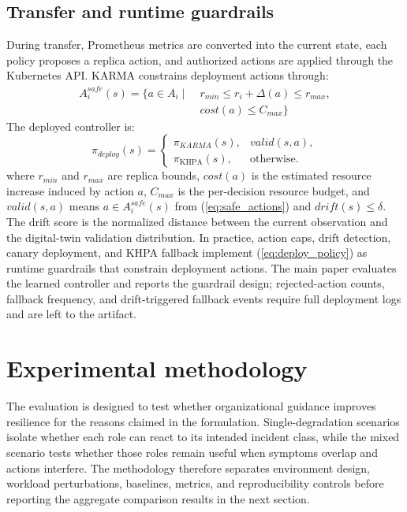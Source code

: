 \documentclass[journal]{IEEEtran}
\newcommand{\khpa}{\mathrm{KHPA}}
\begin{document}
\subsection{Transfer and runtime guardrails}

During transfer, Prometheus metrics are converted into the current state, each policy proposes a replica action, and authorized actions are applied through the Kubernetes API. KARMA constrains deployment actions through:
\begin{equation}
  \begin{aligned}
    A_i^{safe}(s)=\{a\in A_i \mid\; & r_{min}\le r_i+\Delta(a)\le r_{max}, \\
                                    & cost(a)\le C_{max}\}
  \end{aligned}
  \label{eq:safe_actions}
\end{equation}
The deployed controller is:
\begin{equation}
  \pi_{deploy}(s)=
  \begin{cases}
    \pi_{KARMA}(s), & valid(s,a),       \\
    \pi_{\khpa}(s), & \text{otherwise}.
  \end{cases}
  \label{eq:deploy_policy}
\end{equation}
where $r_{min}$ and $r_{max}$ are replica bounds, $cost(a)$ is the estimated resource increase induced by action $a$, $C_{max}$ is the per-decision resource budget, and $valid(s,a)$ means $a\in A_i^{safe}(s)$ from (\autoref{eq:safe_actions}) and $drift(s)\le\delta$. The drift score is the normalized distance between the current observation and the digital-twin validation distribution. In practice, action caps, drift detection, canary deployment, and KHPA fallback implement (\autoref{eq:deploy_policy}) as runtime guardrails that constrain deployment actions. The main paper evaluates the learned controller and reports the guardrail design; rejected-action counts, fallback frequency, and drift-triggered fallback events require full deployment logs and are left to the artifact.

\section{Experimental methodology}
\label{sec:methodology}

The evaluation is designed to test whether organizational guidance improves resilience for the reasons claimed in the formulation. Single-degradation scenarios isolate whether each role can react to its intended incident class, while the mixed scenario tests whether those roles remain useful when symptoms overlap and actions interfere. The methodology therefore separates environment design, workload perturbations, baselines, metrics, and reproducibility controls before reporting the aggregate comparison results in the next section.
\end{document}
